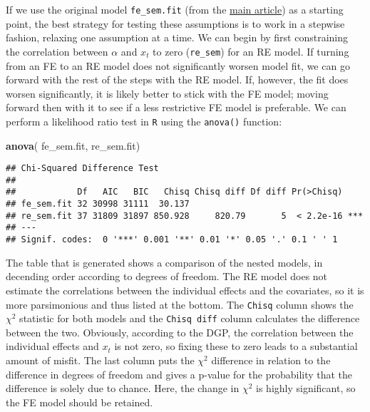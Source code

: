 \documentclass[]{interact}
\theoremstyle{plain}%
\theoremstyle{definition}
\theoremstyle{remark}
\newenvironment{Shaded}{\begin{snugshade}}{\end{snugshade}}
\newcommand{\KeywordTok}[1]{\textcolor[rgb]{0.13,0.29,0.53}{\textbf{#1}}}
\newcommand{\NormalTok}[1]{#1}
\begin{document}
If we use the original model \texttt{fe\_sem.fit} (from the
\href{https://github.com/henrik-andersen/FE-SEM/blob/master/article.pdf}{main
article}) as a starting point, the best strategy for testing these
assumptions is to work in a stepwise fashion, relaxing one assumption at
a time. We can begin by first constraining the correlation between
\(\alpha\) and \(x_{t}\) to zero (\texttt{re\_sem}) for an RE model. If
turning from an FE to an RE model does not significantly worsen model
fit, we can go forward with the rest of the steps with the RE model. If,
however, the fit does worsen significantly, it is likely better to stick
with the FE model; moving forward then with it to see if a less
restrictive FE model is preferable. We can perform a likelihood ratio
test in \texttt{R} using the \texttt{anova()} function:

\small
\singlespacing

\begin{Shaded}
\begin{Highlighting}[]
\KeywordTok{anova}\NormalTok{( fe\_sem.fit, re\_sem.fit)}
\end{Highlighting}
\end{Shaded}

\begin{verbatim}
## Chi-Squared Difference Test
## 
##            Df   AIC   BIC   Chisq Chisq diff Df diff Pr(>Chisq)    
## fe_sem.fit 32 30998 31111  30.137                                  
## re_sem.fit 37 31809 31897 850.928     820.79       5  < 2.2e-16 ***
## ---
## Signif. codes:  0 '***' 0.001 '**' 0.01 '*' 0.05 '.' 0.1 ' ' 1
\end{verbatim}

\doublespacing
\normalsize

The table that is generated shows a comparison of the nested models, in
decending order according to degrees of freedom. The RE model does not
estimate the correlations between the individual effects and the
covariates, so it is more parsimonious and thus listed at the bottom.
The \texttt{Chisq} column shows the \(\chi^{2}\) statistic for both
models and the \texttt{Chisq\ diff} column calculates the difference
between the two. Obviously, according to the DGP, the correlation
between the individual effects and \(x_{t}\) is not zero, so fixing
these to zero leads to a substantial amount of misfit. The last column
puts the \(\chi^{2}\) difference in relation to the difference in
degrees of freedom and gives a p-value for the probability that the
difference is solely due to chance. Here, the change in \(\chi^{2}\) is
highly significant, so the FE model should be retained.
\end{document}
